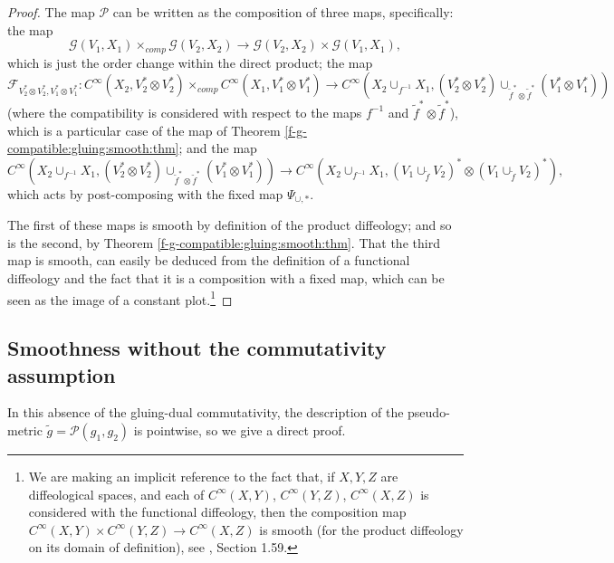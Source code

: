 \documentclass{article}
\begin{document}
\begin{proof}
The map $\mathcal{P}$ can be written as the composition of three maps, specifically: the map
$$\mathcal{G}(V_1,X_1)\times_{comp}\mathcal{G}(V_2,X_2)\to\mathcal{G}(V_2,X_2)\times\mathcal{G}(V_1,X_1),$$ which is just the order change within the direct product; the map
$$\mathcal{F}_{V_2^*\otimes V_2^*,V_1^*\otimes V_1^*}:C^{\infty}(X_2,V_2^*\otimes V_2^*)\times_{comp}C^{\infty}(X_1,V_1^*\otimes V_1^*)\to C^{\infty}(X_2\cup_{f^{-1}}X_1,(V_2^*\otimes
V_2^*)\cup_{\tilde{f}^*\otimes\tilde{f}^*}(V_1^*\otimes V_1^*))$$ (where the compatibility is considered with respect to the maps $f^{-1}$ and $\tilde{f}^*\otimes\tilde{f}^*$), which is a particular case of the map 
of Theorem \ref{f-g-compatible:gluing:smooth:thm}; and the map 
$$C^{\infty}(X_2\cup_{f^{-1}}X_1,(V_2^*\otimes V_2^*)\cup_{\tilde{f}^*\otimes\tilde{f}^*}(V_1^*\otimes V_1^*))\to C^{\infty}(X_2\cup_{f^{-1}}X_1,(V_1\cup_{\tilde{f}}V_2)^*\otimes(V_1\cup_{\tilde{f}}V_2)^*),$$
which acts by post-composing with the fixed map $\Psi_{\cup,*}$.

The first of these maps is smooth by definition of the product diffeology; and so is the second, by Theorem \ref{f-g-compatible:gluing:smooth:thm}. That the third map is smooth, can easily be deduced from the 
definition of a functional diffeology and the fact that it is a composition with a fixed map, which can be seen as the image of a constant plot.\footnote{We are making an implicit reference to the fact that, if $X,Y,Z$
are diffeological spaces, and each of $C^{\infty}(X,Y)$, $C^{\infty}(Y,Z)$, $C^{\infty}(X,Z)$ is considered with the functional diffeology, then the composition map 
$C^{\infty}(X,Y)\times C^{\infty}(Y,Z)\to C^{\infty}(X,Z)$ is smooth (for the product diffeology on its domain of definition), see \cite{iglesiasBook}, Section 1.59.}
\end{proof}


\subsection{Smoothness without the commutativity assumption}

In this absence of the gluing-dual commutativity, the description of the pseudo-metric $\tilde{g}=\mathcal{P}(g_1,g_2)$ is pointwise, so we give a direct proof.
\end{document}
